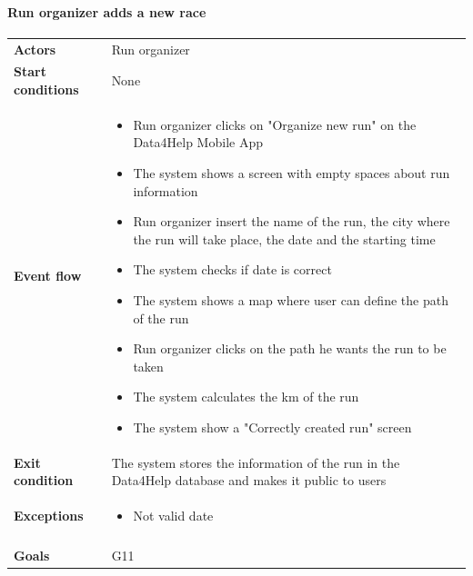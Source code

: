 \paragraph{Run organizer adds a new race}
\begin{center}
\begin{table}[H]
\centering
\begin{tabular}{l|p{}}
\textbf{Actors} & Run organizer \\
\textbf{Start conditions} & None \\
\textbf{Event flow}  & \begin{minipage}[t]{0.7\textwidth}
    \begin{itemize}
    \item Run organizer clicks on "Organize new run" on the Data4Help Mobile App 
    \item The system shows a screen with empty spaces about run information
    \item Run organizer insert the name of the run, the city where the run will take place, the date and the starting time
    \item The system checks if date is correct
    \item The system shows a map where user can define the path of the run
    \item Run organizer clicks on the path he wants the run to be taken
    \item The system calculates the km of the run
    \item The system show a "Correctly created run" screen
\end{itemize}
    
\end{minipage} \\
\textbf{Exit condition} & The system stores the information of the run in the Data4Help database and makes it public to users \\
\textbf{Exceptions} & \begin{minipage}[t]{0.7\textwidth}
    \begin{itemize}
\item Not valid date
    \end{itemize}
    
\end{minipage} \\ \\
\textbf{Goals} & G11
\end{tabular}

\end{table}
\end{center}


